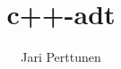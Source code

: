 \documentclass[titlepage,a4paper]{article}
\title{c++-adt}
\author{Jari Perttunen}
\begin{document}
\maketitle
\tableofcontents
\pagebreak
\listoffigures
\pagebreak









\end{document}

